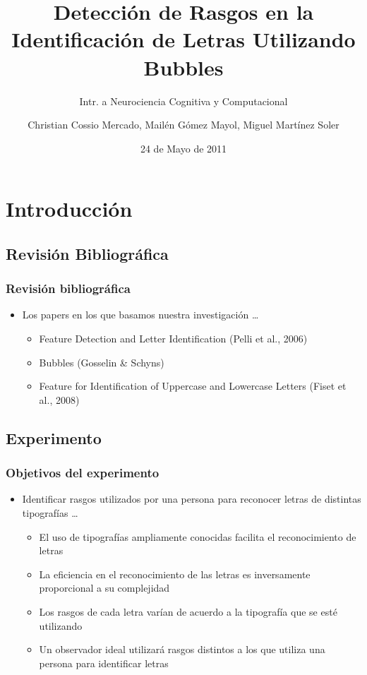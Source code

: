\documentclass[10pt,presentation]{beamer}
\title{Detecci\'on de Rasgos en la Identificaci\'on de Letras Utilizando Bubbles}
\subtitle{Intr. a Neurociencia Cognitiva y Computacional}
\author[Cossio Mercado, Gomez Mayol, Martinez Soler]{Christian Cossio Mercado, Mail\'en G\'omez Mayol, Miguel Mart\'inez Soler}
\institute{Departamento de Computación - FCEyN, UBA}
\date{24 de Mayo de 2011}
\begin{document}
\begin{frame}%
  \titlepage
\end{frame}

\section{Introducci\'on}
\subsection{Revisi\'on Bibliogr\'afica}
\begin{frame}
  \frametitle{Revisión bibliográfica}
  \begin{itemize}
    \item Los papers en los que basamos nuestra investigaci\'on \ldots \pause
    \begin{itemize}
      \item Feature Detection and Letter Identification (Pelli et al., 2006) \pause
      \item Bubbles (Gosselin & Schyns) \pause
      \item Feature for Identification of Uppercase and Lowercase Letters (Fiset et al., 2008)
    \end{itemize}
\end{itemize}
\end{frame}

\subsection{Experimento}
\begin{frame}
  \frametitle{Objetivos del experimento}
  \begin{itemize}
    \item Identificar rasgos utilizados por una persona para reconocer letras de distintas tipograf\'ias  \ldots \pause
    \begin{itemize}
      \item El uso de tipograf\'ias ampliamente conocidas facilita el reconocimiento de letras \pause
      \item La eficiencia en el reconocimiento de las letras es inversamente proporcional a su complejidad \pause
      \item Los rasgos de cada letra var\'ian de acuerdo a la tipograf\'ia que se est\'e utilizando \pause
      \item Un observador ideal utilizar\'a rasgos distintos a los que utiliza una persona para identificar letras	
    \end{itemize}
\end{itemize}
\end{frame}
\end{document}
